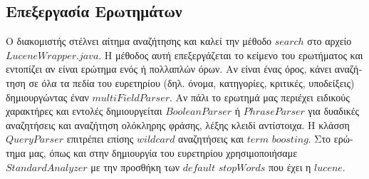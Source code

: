 \subsection{\textgreek{Επεξεργασία Ερωτημάτων}}
\textgreek {
    Ο διακομιστής στέλνει αίτημα αναζήτησης και καλεί την μέθοδο $search$ στο αρχείο $LuceneWrapper.java$.
    Η μέθοδος αυτή επεξεργάζεται το κείμενο του ερωτήματος και εντοπίζει αν είναι ερώτημα ενός ή πολλαπλών όρων.
    Αν είναι ένας όρος, κάνει αναζήτηση σε όλα τα πεδία του ευρετηρίου (δηλ. όνομα, κατηγορίες, κριτικές, υποδείξεις)
    δημιουργώντας έναν $multiFieldParser$.
    Αν πάλι το ερωτημά μας περιέχει ειδικούς χαρακτήρες και εντολές δημιουργείται $BooleanParser$ ή $PhraseParser$ για
    δυαδικές αναζητήσεις και αναζήτηση ολόκληρης φράσης, λέξης κλειδί αντίστοιχα.
    Η κλάσση $QueryParser$ επιτρέπει επίσης $wildcard$ αναζητήσεις και $term$ $boosting$.
    Στο ερώτημα μας, όπως και στην δημιουργία του ευρετηρίου χρησιμοποιήσαμε $StandardAnalyzer$ με την προσθήκη των 
    $default$ $stopWords$ που έχει η $lucene$.
}

